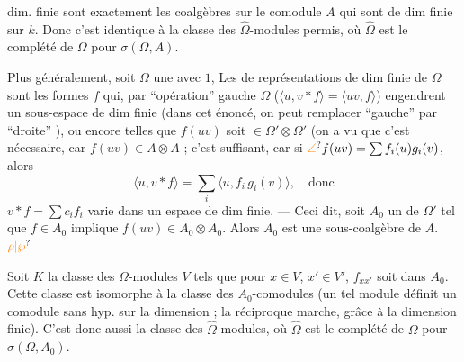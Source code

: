 dim. finie sont exactement les coalgèbres 
sur le comodule $A$ qui sont de dim finie
sur $k$. Donc c'est identique à la classe des
$\widehat\Omega$-modules permis, où $\widehat\Omega$ est le
complété de $\Omega$ pour $\sigma(\Omega,A)$.

Plus généralement, soit $\Omega$ une 
avec $1$, 
 
Les  de représentations
 de dim finie de $\Omega$ sont les
formes $f$ qui, par ``opération''  gauche
 $\Omega$ ($\langle u,v*f\rangle=\langle uv,f\rangle$) engendrent un
sous-espace de dim finie 
\margin{\[\begin{aligned}v*f_{x,x'}&=f_{vx,x'},\\ f_{x,x'}*v&=f_{x,{}^tv.x'}\end{aligned}\]}
(dans cet énoncé, on peut remplacer ``gauche''
par ``droite'' ), ou encore telles que
$f(uv)$ soit $\in\Omega'\otimes\Omega'$ (on a vu que
c'est nécessaire, car $f(uv)\in A\otimes A$ ;
c'est suffisant, car si $\deleted{\unsure{\angle}} f(uv)=
\sum f_i(u)g_i(v)$, alors
\[
\langle u,v*f\rangle=\sum_i\langle u,f_i\,g_i(v)\rangle,\quad\text{donc}
\]
$v*f=\sum c_i f_i$ varie dans un espace
de dim finie. --- Ceci dit,
soit $A_0$ un   de $\Omega'$ tel
que $f\in A_0$ implique $f(uv)\in A_0\otimes A_0$.
Alors $A_0$ est une sous-coalgèbre de $A$.$\unsure{\rho|\wp}$

Soit $K$ la classe des $\Omega$-modules $V$  tels que
pour $x\in V$, $x'\in V'$, $f_{xx'}$ soit dans $A_0$. Cette
classe est isomorphe à la classe des $A_0$-comodules
(un tel module définit un
comodule sans hyp. sur la dimension ;
la réciproque marche, grâce à la dimension
finie). C'est donc aussi la classe des
$\widehat\Omega$-modules, où $\widehat\Omega$ est le complété
 de $\Omega$ pour $\sigma(\Omega,A_0)$.

